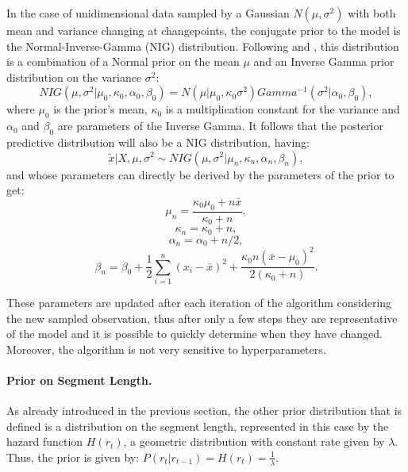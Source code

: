 \documentclass[11pt,twoside,a4paper]{report}
\begin{document}
In the case of unidimensional data sampled by a Gaussian $N(\mu,\sigma^2)$ with both mean and variance changing at changepoints, the conjugate prior to the model is the Normal-Inverse-Gamma (NIG) distribution. Following \cite{book1} and \cite{book2}, this distribution is a combination of a Normal prior on the mean $\mu$ and an Inverse Gamma prior distribution on the variance $\sigma^2$:
\begin{equation}
NIG(\mu, \sigma^2 | \mu_0, \kappa_0, \alpha_0, \beta_0) = N(\mu | \mu_0, \kappa_0\sigma^2)Gamma^{-1}(\sigma^2 | \alpha_0, \beta_0),
\end{equation}
where $\mu_0$ is the prior's mean, $\kappa_0$ is a multiplication constant for the variance and $\alpha_0$ and $\beta_0$ are parameters of the Inverse Gamma. It follows that the posterior predictive distribution will also be a NIG distribution, having:
\begin{equation}
\tilde{x} | X, \mu, \sigma^2  \sim NIG(\mu, \sigma^2 | \mu_n, \kappa_n, \alpha_n, \beta_n),
\end{equation}
and whose parameters can directly be derived by the parameters of the prior to get:
\begin{equation}
\mu_n = \frac{\kappa_0\mu_0 + n\bar{x}}{\kappa_0 + n},
\end{equation}
\begin{equation}
\kappa_n = \kappa_0 + n,
\end{equation}
\begin{equation}
\alpha_n = \alpha_0 + n/2,
\end{equation}
\begin{equation}
\beta_n = \beta_0 + \frac{1}{2} \sum_{i=1}^{n} (x_i - \bar{x})^2 + \frac{\kappa_0n(\bar{x} - \mu_0)^2}{2(\kappa_0 + n)}.
\end{equation}

These parameters are updated after each iteration of the algorithm considering the new sampled observation, thus after only a few steps they are representative of the model and it is possible to quickly determine when they have changed. Moreover, the algorithm is not very sensitive to hyperparameters.

\paragraph{Prior on Segment Length.}

As already introduced in the previous section, the other prior distribution that is defined is a distribution on the segment length, represented in this case by the hazard function $H(r_t)$, a geometric distribution with constant rate given by $\lambda$. Thus, the prior is given by: $P(r_t | r_{t - 1}) = H(r_t) = \frac{1}{\lambda}$.
\end{document}
